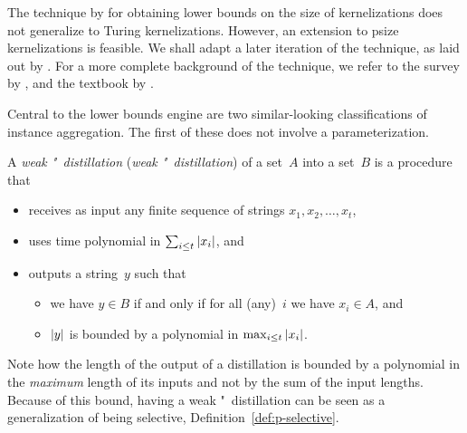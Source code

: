 The technique by \textcite{bodlaender2009problems} for obtaining lower bounds on the size of kernelizations does not generalize to Turing kernelizations.
However, an extension to psize kernelizations is feasible.
We shall adapt a later iteration of the technique, as laid out by \textcite[Section~3]{bodlaender2014kernelization}.
For a more complete background of the technique, we refer to the survey by \textcite{kratsch2014recent}, and the textbook by \textcite{fomin2019kernelization}.

Central to the lower bounds engine are two similar-looking classifications of instance aggregation.
The first of these does not involve a parameterization.
\begin{definition}
\label{def:distillation}%
  A \emph{weak "~distillation} (\emph{weak "~distillation}) of a set~$A$ into a set~$B$ is a procedure that
  \begin{itemize}
  \item receives as input any finite sequence of strings $x_1, x_2, \ldots, x_t$,
  \item uses time polynomial in $\sum_{i \le t} {\lvert x_i\rvert}$, and
  \item outputs a string~$y$ such that
    \begin{itemize}
    \item we have $y \in B$ if and only if for all (any)~$i$ we have $x_i \in A$, and
    \item ${\lvert y\rvert}$ is bounded by a polynomial in $\max_{i \le t} {\lvert x_i\rvert}$.
    \end{itemize}
  \end{itemize}
\end{definition}

Note how the length of the output of a distillation is bounded by a polynomial in the \emph{maximum} length of its inputs and not by the sum of the input lengths.
Because of this bound, having a weak "~distillation can be seen as a generalization of being \pdash{}selective, Definition~\ref{def:p-selective}.

